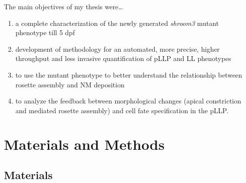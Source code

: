 \documentclass[11pt,singlespacinge,twoside]{reedthesis} %
\providecommand{\tightlist}{%
  \setlength{\itemsep}{0pt}\setlength{\parskip}{0pt}}
\theoremstyle{definition}
\theoremstyle{definition}
\theoremstyle{definition}
\theoremstyle{remark}
\begin{document}
The main objectives of my thesis were\ldots{}
\begin{enumerate}
\def\labelenumi{\arabic{enumi}.}
\tightlist
\item
  a complete characterization of the newly generated \emph{shroom3} mutant phenotype till 5 dpf
\item
  development of methodology for an automated, more precise, higher throughput and less invasive quantification of pLLP and LL phenotypes
\item
  to use the mutant phenotype to better understand the relationship between rosette assembly and NM deposition
\item
  to analyze the feedback between morphological changes (apical constriction and mediated rosette assembly) and cell fate specification in the pLLP.
\end{enumerate}
\hypertarget{mat-met}{%
\chapter{Materials and Methods}\label{mat-met}}

\hypertarget{mat}{%
\section{Materials}\label{mat}}
\end{document}
